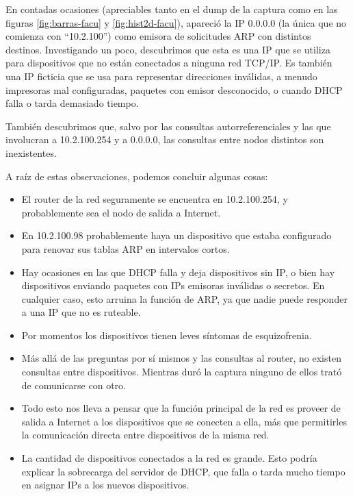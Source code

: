 En contadas ocasiones (apreciables tanto en el dump de la captura
como en las figuras \ref{fig:barras-facu} y \ref{fig:hist2d-facu}), apareció la
IP 0.0.0.0 (la única que no comienza con ``10.2.100'') como emisora de
solicitudes ARP con distintos destinos. Investigando un poco, descubrimos que
esta es una IP que se utiliza para dispositivos que no están conectados a
ninguna red TCP/IP. Es también una IP ficticia que se usa para representar
direcciones inválidas, a menudo impresoras mal configuradas, paquetes con emisor
desconocido, o cuando DHCP falla o tarda demasiado tiempo.

También descubrimos que, salvo por las consultas autorreferenciales y las que
involucran a 10.2.100.254 y a 0.0.0.0, las consultas entre nodos distintos son
inexistentes.

A raíz de estas observaciones, podemos concluir algunas cosas:
\begin{itemize}
  \item El router de la red seguramente se encuentra en 10.2.100.254, y
probablemente sea el nodo de salida a Internet.
  \item En 10.2.100.98 probablemente haya un dispositivo que estaba configurado
para renovar sus tablas ARP en intervalos cortos.
  \item Hay ocasiones en las que DHCP falla y deja dispositivos sin IP, o bien
hay dispositivos enviando paquetes con IPs emisoras inválidas o secretos. En
cualquier caso, esto arruina la función de ARP, ya que nadie puede
responder a una IP que no es ruteable.
  \item Por momentos los dispositivos tienen leves síntomas de
esquizofrenia.
  \item Más allá de las preguntas por sí mismos y las consultas al router, no
existen consultas entre dispositivos. Mientras duró la captura ninguno de ellos
trató de comunicarse con otro.
  \item Todo esto nos lleva a pensar que la función principal de la red es
proveer de salida a Internet a los dispositivos que se conecten a ella, más que
permitirles la comunicación directa entre dispositivos de la misma red.
  \item La cantidad de dispositivos conectados a la red es grande.  Esto podría
explicar la sobrecarga del servidor de DHCP, que falla o tarda mucho tiempo en
asignar IPs a los nuevos dispositivos. 
\end{itemize}

